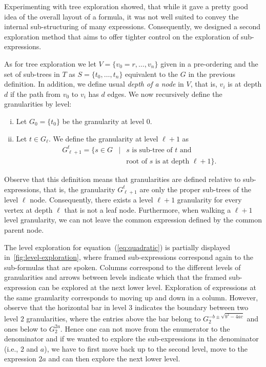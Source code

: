 \documentclass{sig-alternate}
\begin{document}
Experimenting with tree exploration showed, that while it gave a pretty good
idea of the overall layout of a formula, it was not well suited to convey the
internal sub-structuring of many expressions. Consequently, we designed a second
exploration method that aims to offer tighter control on the exploration of
sub-expressions.

As for tree exploration we let $V=\{v_0=r,\ldots,v_n\}$ given in a pre-ordering
and the set of sub-trees in $T$ as $S=\{t_0,\ldots, t_n\}$ equivalent to the $G$
in the previous definition. In addition, we define usual \emph{depth of a node}
in $V$, that is, $v_i$ is at depth $d$ if the path from $v_0$ to $v_i$ has $d$
edges. We now recursively define the granularities by level:
\begin{enumerate}[(i)]
\item Let $G_0=\{t_0\}$ be the granularity at level $0$.
\item Let $t\in G_\ell$. We define the granularity at level $\ell + 1$ as
  \begin{eqnarray*}
    G^t_{\ell+1} = \{s\in G & | & s \mbox{ is sub-tree of } t\mbox{ and }\\ 
    & & \mbox{root of } s \mbox{ is at depth } \ell+1\}.
  \end{eqnarray*}
\end{enumerate}
Observe that this definition means that granularities are defined relative to
sub-expressions, that is, the granularity $G^t_{\ell+1}$ are only the proper
sub-trees of the level $\ell$ node. Consequently, there exists a level $\ell+1$
granularity for every vertex at depth $\ell$ that is not a leaf
node. Furthermore, when walking a $\ell+1$ level granularity, we can not leave
the common expression defined by the common parent node.

The level exploration for equation~(\ref{eq:quadratic}) is partially
displayed in~\ref{fig:level-exploration}, where framed sub-expressions correspond
again to the sub-formulas that are spoken. Columns correspond to the different
levels of granularities and arrows between levels indicate which that the framed
sub-expression can be explored at the next lower level. Exploration of
expressions at the same granularity corresponds to moving up and down in a
column. However, observe that the horizontal bar in level $3$ indicates the
boundary between two level $2$ granularities, where the entries above the bar
belong to $G^{-b\pm\sqrt{b^2-4ac}}_2$ and ones below to $G^{2a}_2$. Hence one
can not move from the enumerator to the denominator and if we wanted to explore
the sub-expressions in the denominator (i.e., $2$ and $a$), we have to first move
back up to the second level, move to the expression $2a$ and can then explore
the next lower level.
\end{document}
